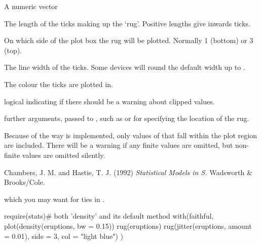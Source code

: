 \begin{Arguments}
\begin{ldescription}
\item[\code{x}] A numeric vector
\item[\code{ticksize}] The length of the ticks making up the `rug'.
Positive lengths give inwards ticks.
\item[\code{side}] On which side of the plot box the rug will be
plotted. Normally 1 (bottom) or 3 (top).
\item[\code{lwd}] The line width of the ticks.  Some devices will round the
default width up to .
\item[\code{col}] The colour the ticks are plotted in.
\item[\code{quiet}] logical indicating if there should be a warning about
clipped values.
\item[\code{...}] further arguments, passed to , such
as  or  for specifying the location of the rug.
\end{ldescription}
\end{Arguments}
%
\begin{Details}\relax
Because of the way  is implemented, only values of 
that fall within the plot region are included.  There will be a
warning if any finite values are omitted, but non-finite values are
omitted silently.
\end{Details}
%
\begin{References}\relax
Chambers, J. M. and Hastie, T. J. (1992)
\emph{Statistical Models in S.}
Wadsworth \& Brooks/Cole.
\end{References}
%
\begin{SeeAlso}\relax
{} which you may want for ties in .
\end{SeeAlso}
%
\begin{Examples}
\begin{ExampleCode}
require(stats)# both 'density' and its default method
with(faithful, {
    plot(density(eruptions, bw = 0.15))
    rug(eruptions)
    rug(jitter(eruptions, amount = 0.01), side = 3, col = "light blue")
})
\end{ExampleCode}
\end{Examples}
